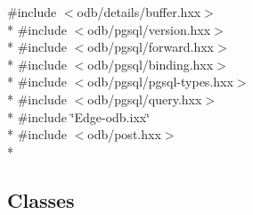 {\ttfamily \#include $<$odb/details/buffer.\+hxx$>$}\\*
{\ttfamily \#include $<$odb/pgsql/version.\+hxx$>$}\\*
{\ttfamily \#include $<$odb/pgsql/forward.\+hxx$>$}\\*
{\ttfamily \#include $<$odb/pgsql/binding.\+hxx$>$}\\*
{\ttfamily \#include $<$odb/pgsql/pgsql-\/types.\+hxx$>$}\\*
{\ttfamily \#include $<$odb/pgsql/query.\+hxx$>$}\\*
{\ttfamily \#include \char`\"{}Edge-\/odb.\+ixx\char`\"{}}\\*
{\ttfamily \#include $<$odb/post.\+hxx$>$}\\*
\subsection*{Classes}
